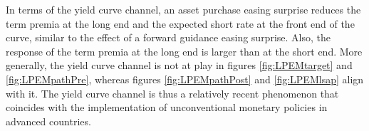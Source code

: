 {In terms of the yield curve channel, an asset purchase easing surprise reduces the term premia at the long end and the expected short rate at the front end of the curve, similar to the effect of a forward guidance easing surprise.
Also, the response of the term premia at the long end is larger than at the short end.
More generally, %
the yield curve channel is not at play in figures \ref{fig:LPEMtarget} and \ref{fig:LPEMpathPre}, %
whereas figures \ref{fig:LPEMpathPost} and \ref{fig:LPEMlsap} align with it. %
The yield curve channel is thus a relatively recent phenomenon that coincides with the implementation of unconventional monetary policies in advanced countries.



}
